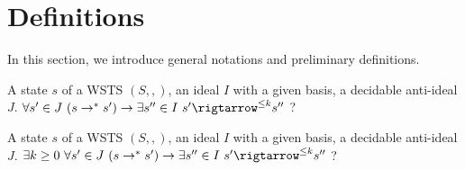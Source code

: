 
\section{Definitions}\label{section definitions}



In this section, we introduce general notations and preliminary definitions.






{A state $s$ of a WSTS $(S,,)$, an ideal $I$ with a given basis, a decidable anti-ideal $J$.}
{$\forall s' \in J ~ (s \rightarrow^* s') \to \exists s'' \in I ~ s' \rigtarrow^{\leq k} s''$ ?\newline}


{A state $s$ of a WSTS $(S,,)$, an ideal $I$ with a given basis, a decidable anti-ideal $J$.}
{$\exists k \geq 0 ~ \forall s' \in J ~ (s \rightarrow^* s') \to \exists s'' \in I ~ s' \rigtarrow^{\leq k} s''$ ?\newline}



